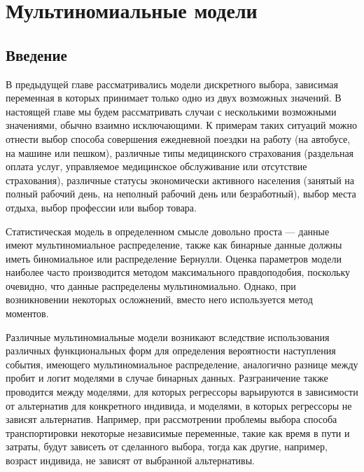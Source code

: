 
\chapter{Мультиномиальные модели}

\section{Введение}

В предыдущей главе рассматривались модели дискретного выбора, зависимая переменная в которых принимает только одно из двух возможных значений. В настоящей главе мы будем рассматривать случаи с несколькими возможными значениями, обычно взаимно исключающими. К примерам таких ситуаций можно отнести выбор способа совершения ежедневной поездки на работу (на автобусе, на машине или пешком), различные типы медицинского страхования (раздельная оплата услуг, управляемое медицинское обслуживание или отсутствие страхования), различные статусы экономически активного населения (занятый на полный рабочий день, на неполный рабочий день или безработный), выбор места отдыха, выбор профессии или выбор товара.

Статистическая модель в определенном смысле довольно проста --- данные имеют мультиномиальное распределение, также как бинарные данные должны иметь биномиальное или распределение Бернулли. Оценка параметров модели наиболее часто производится методом максимального правдоподобия, поскольку очевидно, что данные распределены мультиномиально. Однако, при возникновении некоторых осложнений, вместо него используется метод моментов.

Различные мультиномиальные модели возникают вследствие использования различных функциональных форм для определения вероятности наступления события, имеющего мультиномиальное распределение, аналогично разнице между пробит и логит моделями в случае бинарных данных. Разграничение также проводится между моделями, для которых регрессоры варьируются в зависимости от альтернатив для конкретного индивида, и моделями, в которых регрессоры не зависят альтернатив. Например, при рассмотрении проблемы выбора способа транспортировки некоторые независимые переменные, такие как время в пути и затраты, будут зависеть от сделанного выбора, тогда как другие, например, возраст индивида, не зависят от выбранной альтернативы.

